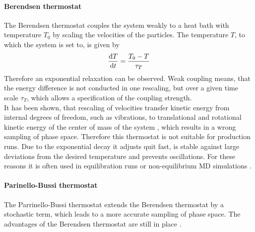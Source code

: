 \paragraph{Berendsen thermostat}
The Berendsen thermostat \autocite{berendsen} couples the system weakly to a heat bath with temperature $T_0$ by scaling the velocities of the particles. The temperature $T$, to which the system is set to, is given by
\begin{equation}
\label{eq:berendsen_time_evolving}
\frac{\text{d} T}{\text{d} t} = \frac{T_0 - T}{\tau_T}
\end{equation}
Therefore an exponential relaxation can be observed. Weak coupling means, that the energy difference is not conducted in one rescaling, but over a given time scale $\tau_T$, which allows a specification of the coupling strength.\\
It has been shown, that rescaling of velocities transfer kinetic energy from internal degrees of freedom, such as vibrations, to translational and rotational kinetic energy of the center of mass of the system \autocite[p. 738]{velRescaleSucks}, which results in a wrong sampling of phase space. Therefore this thermostat is not suitable for production runs. Due to the exponential decay it adjusts quit fast, is stable against large deviations from the desired temperature and prevents oscillations. For these reasons it is often used in equilibration runs or non-equilibrium MD simulations \autocite[p. 3689]{berendsen}.
\paragraph{Parinello-Bussi thermostat}
The Parrinello-Bussi  thermostat \autocite{parinelloBussi} extends the Berendsen thermostat by a stochastic term, which leads to a more accurate sampling of phase space. The advantages of the Berendsen thermostat are still in place \autocite[p. 31]{gromacsManual}.
